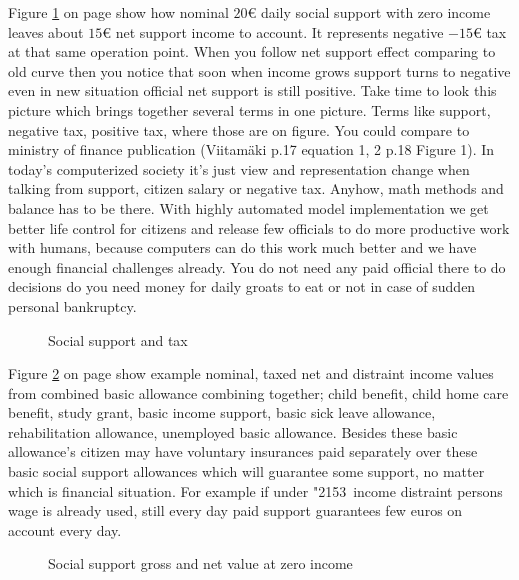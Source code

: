 Figure \ref{fig:SocTax} on page \pageref{fig:SocTax} show how nominal $20\euro$ daily
social support with zero income leaves about $15\euro$ net support income to account.
It represents negative $-15\euro$ tax at that same operation point.
When you follow net support effect comparing to old curve
then you notice that soon when income grows support turns to negative
even in new situation official net support is still positive.
Take time to look this picture which brings together several terms in one picture.
Terms like support, negative tax, positive tax, where those are on figure.
You could compare to ministry of finance publication
(Viitam\"aki\cite{VM_46_2019} p.17 equation 1, 2 p.18 Figure 1).
In today's computerized society it's just view and representation change
when talking from support, citizen salary or negative tax.
Anyhow, math methods and balance has to be there.
With highly automated model implementation we get better life control for citizens
and release few officials to do more productive work with humans,
because computers can do this work much better
and we have enough financial challenges already.
You do not need any paid official there
to do decisions do you need money for daily groats to eat or not
in case of sudden personal bankruptcy.
\begin{figure} %
 \begin{center}
  \caption{Social support and tax}
  \label{fig:SocTax}  
 \end{center}
\end{figure}

Figure \ref{fig:SocialSu} on page \pageref{fig:SocialSu} show example nominal,
taxed net and distraint income values from combined basic allowance combining together;
child benefit,
child home care benefit,
study grant,
basic income support,
basic sick leave allowance,
rehabilitation allowance,
unemployed basic allowance.
Besides these basic allowance's citizen may have voluntary insurances
paid separately over these basic social support allowances
which will guarantee some support, no matter which is financial situation.
For example if under \char"2153~income distraint persons wage is already used,
still every day paid support guarantees few euros on account every day.

\begin{figure} %
 \begin{center}
  \caption{Social support gross and net value at zero income}
  \label{fig:SocialSu} 
 \end{center}
\end{figure}

